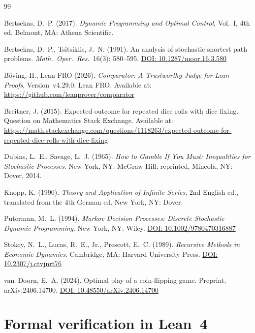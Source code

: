 \documentclass[12pt]{article}
\theoremstyle{definition}
\theoremstyle{remark}
\begin{document}
\begin{thebibliography}{99}

  Bertsekas, D.~P. (2017).
  \emph{Dynamic Programming and Optimal Control},
  Vol.~I, 4th ed.
  Belmont, MA: Athena Scientific.

  Bertsekas, D.~P., Tsitsiklis, J.~N. (1991).
  An analysis of stochastic shortest path problems.
  \emph{Math.\ Oper.\ Res.}\ 16(3): 580--595.
  \href{https://doi.org/10.1287/moor.16.3.580}{DOI: 10.1287/moor.16.3.580}

  B\"oving, H., Lean FRO (2026).
  \emph{Comparator: A Trustworthy Judge for Lean Proofs},
  Version~v4.29.0. Lean FRO.
  Available at: \url{https://github.com/leanprover/comparator}

  Breitner, J. (2015).
  Expected outcome for repeated dice rolls with dice fixing.
  Question on Mathematics Stack Exchange.
  Available at:
  \url{https://math.stackexchange.com/questions/1118263/expected-outcome-for-repeated-dice-rolls-with-dice-fixing}

  Dubins, L.~E., Savage, L.~J. (1965).
  \emph{How to Gamble If You Must: Inequalities for Stochastic
    Processes}.
  New York, NY: McGraw-Hill; reprinted, Mineola, NY: Dover, 2014.

  Knopp, K. (1990).
  \emph{Theory and Application of Infinite Series},
  2nd English ed., translated from the 4th German ed.
  New York, NY: Dover.

  Puterman, M.~L. (1994).
  \emph{Markov Decision Processes: Discrete Stochastic Dynamic
    Programming}.
  New York, NY: Wiley.
  \href{https://doi.org/10.1002/9780470316887}{DOI: 10.1002/9780470316887}

  Stokey, N.~L., Lucas, R.~E., Jr., Prescott, E.~C. (1989).
  \emph{Recursive Methods in Economic Dynamics}.
  Cambridge, MA: Harvard University Press.
  \href{https://doi.org/10.2307/j.ctvjnrt76}{DOI: 10.2307/j.ctvjnrt76}

  van~Doorn, E.~A. (2024).
  Optimal play of a coin-flipping game.
  Preprint, arXiv:2406.14700.
  \href{https://doi.org/10.48550/arXiv.2406.14700}{DOI: 10.48550/arXiv.2406.14700}

\end{thebibliography}

\appendix

\section{Formal verification in Lean~4}\label{app:lean}
\end{document}
